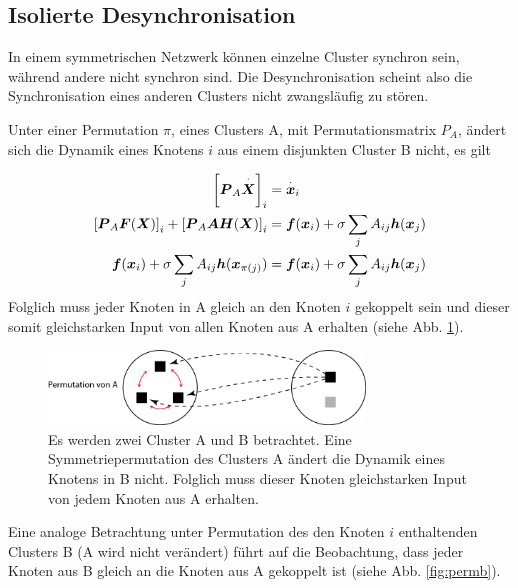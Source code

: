 {\subsection*{Isolierte Desynchronisation}}
In einem symmetrischen Netzwerk können einzelne Cluster synchron sein, während andere nicht synchron sind. Die Desynchronisation scheint also die Synchronisation eines anderen Clusters nicht zwangsläufig zu stören\cite{pecora2014}.

Unter einer Permutation $\pi$, eines Clusters A, mit Permutationsmatrix $P_A$, ändert sich die Dynamik eines Knotens $i$ aus einem disjunkten Cluster B nicht, es gilt



\begin{align}
		\notag \left[\boldsymbol{P}_A	\overset{\cdot}{\boldsymbol{X}}\right]_i&= \overset{\cdot}{\boldsymbol{x}}_i\\
		\notag\left[\boldsymbol{P}_A \boldsymbol{F}(\boldsymbol{X})\right]_i+
			\left[\boldsymbol{P}_A\boldsymbol{A}\boldsymbol{H}(\boldsymbol{X})\right]_i&=
			\boldsymbol{f}(\boldsymbol{x}_i)+
			\sigma\sum_j A_{ij}\boldsymbol{h}(\boldsymbol{x}_j)\\
		\boldsymbol{f}(\boldsymbol{x}_i)+
			\sigma\sum_j A_{ij}\boldsymbol{h}(\boldsymbol{x}_{\pi\left(j\right)})&=
		\boldsymbol{f}(\boldsymbol{x}_i)+
			\sigma\sum_j A_{ij}\boldsymbol{h}(\boldsymbol{x}_j)		
\end{align}
Folglich muss jeder Knoten in A gleich an den Knoten $i$ gekoppelt sein und dieser somit gleichstarken Input von allen Knoten aus A erhalten (siehe Abb. \ref{fig:perma}).

\begin{figure}
		\includegraphics[width=0.75\textwidth]{abb/misc/perm_a.png}
		\caption{Es werden zwei Cluster A und B betrachtet. Eine Symmetriepermutation des Clusters A ändert die Dynamik eines Knotens in B nicht. Folglich muss dieser Knoten gleichstarken Input von jedem Knoten aus A erhalten.}
		\label{fig:perma}
\end{figure}


Eine analoge Betrachtung  unter Permutation des den Knoten $i$ enthaltenden Clusters B (A wird nicht verändert) führt auf die Beobachtung, dass jeder Knoten aus B gleich an die Knoten aus A gekoppelt ist (siehe Abb. \ref{fig:permb}). 

